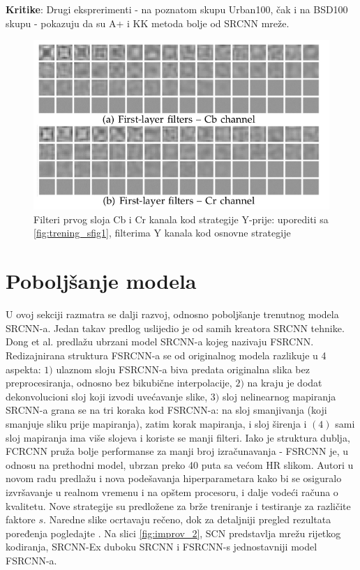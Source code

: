 \documentclass[12pt]{report}
\numberwithin{equation}{section}
\begin{document}
 \textbf{Kritike}: Drugi eksprerimenti - na poznatom skupu Urban100, čak i na BSD100 skupu - pokazuju da su A+ i KK metoda bolje od SRCNN mreže. \cite{files}


\begin{figure}[h]
\includegraphics[width=\textwidth]{SLIKE/figure13}
\centering
\caption{Filteri prvog sloja Cb i Cr kanala kod strategije Y-prije: uporediti sa \ref{fig:trening_sfig1}, filterima Y kanala kod osnovne strategije}
\label{fig:13ogled}
\end{figure}

\chapter{Poboljšanje modela}\label{ch2} 

 U ovoj sekciji razmatra se dalji razvoj, odnosno poboljšanje trenutnog modela SRCNN-a. Jedan takav predlog uslijedio je od samih kreatora SRCNN tehnike. Dong et al. predlažu ubrzani model SRCNN-a kojeg nazivaju FSRCNN. \cite{improv1}
  Redizajnirana struktura FSRCNN-a se od originalnog modela razlikuje u 4 aspekta: $1)$ ulaznom sloju FSRCNN-a biva predata originalna slika bez preprocesiranja, odnosno bez bikubične interpolacije, $2)$ na kraju je dodat dekonvolucioni sloj koji izvodi uvećavanje slike, $3)$ sloj nelinearnog mapiranja SRCNN-a grana se na tri koraka kod FSRCNN-a: na sloj smanjivanja (koji smanjuje sliku prije mapiranja), zatim korak mapiranja, i sloj širenja i $(4)$ sami sloj mapiranja ima više slojeva i koriste se manji filteri. Iako je struktura dublja, FCRCNN pruža bolje performanse za manji broj izračunavanja - FSRCNN je, u odnosu na prethodni model, ubrzan preko 40 puta sa većom HR slikom. Autori u novom radu predlažu i nova podešavanja hiperparametara kako bi se osiguralo izvršavanje u realnom vremenu i na opštem procesoru, i dalje vodeći računa o kvalitetu. Nove strategije su predložene za  brže treniranje i testiranje za različite faktore $s$. 
 Naredne slike ocrtavaju rečeno, dok za detaljniji pregled rezultata poređenja pogledajte \cite{supp2}. Na slici \ref{fig:improv_2}, SCN predstavlja mrežu rijetkog kodiranja, SRCNN-Ex duboku SRCNN i FSRCNN-s jednostavniji model FSRCNN-a.
    
\end{document}
